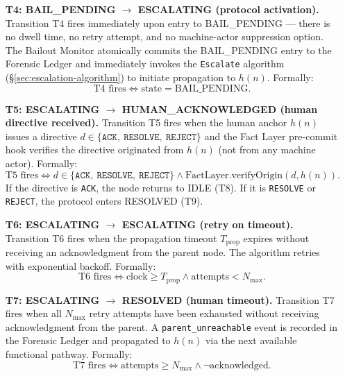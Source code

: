 \begin{enumerate}
\item[\textbf{T4: BAIL\_PENDING $\rightarrow$ ESCALATING (protocol activation).}] Transition T4 fires immediately upon entry to BAIL\_PENDING — there is no dwell time, no retry attempt, and no machine-actor suppression option. The Bailout Monitor atomically commits the BAIL\_PENDING entry to the Forensic Ledger and immediately invokes the \texttt{Escalate} algorithm (\S\ref{sec:escalation-algorithm}) to initiate propagation to $h(n)$. Formally:
\begin{equation}
\text{T4 fires} \iff \text{state} = \text{BAIL\_PENDING}. \tag{T4}
\end{equation}

\item[\textbf{T5: ESCALATING $\rightarrow$ HUMAN\_ACKNOWLEDGED (human directive received).}] Transition T5 fires when the human anchor $h(n)$ issues a directive $d \in \{\texttt{ACK},\ \texttt{RESOLVE},\ \texttt{REJECT}\}$ and the Fact Layer pre-commit hook verifies the directive originated from $h(n)$ (not from any machine actor). Formally:
\begin{equation}
\text{T5 fires} \iff d \in \{\texttt{ACK},\ \texttt{RESOLVE},\ \texttt{REJECT}\} \land \text{FactLayer.verifyOrigin}(d, h(n)). \tag{T5}
\end{equation}
If the directive is \texttt{ACK}, the node returns to IDLE (T8). If it is \texttt{RESOLVE} or \texttt{REJECT}, the protocol enters RESOLVED (T9).

\item[\textbf{T6: ESCALATING $\rightarrow$ ESCALATING (retry on timeout).}] Transition T6 fires when the propagation timeout $T_{\text{prop}}$ expires without receiving an acknowledgment from the parent node. The algorithm retries with exponential backoff. Formally:
\begin{equation}
\text{T6 fires} \iff \text{clock} \geq T_{\text{prop}} \land \text{attempts} < N_{\max}. \tag{T6}
\end{equation}

\item[\textbf{T7: ESCALATING $\rightarrow$ RESOLVED (human timeout).}] Transition T7 fires when all $N_{\max}$ retry attempts have been exhausted without receiving acknowledgment from the parent. A \texttt{parent\_unreachable} event is recorded in the Forensic Ledger and propagated to $h(n)$ via the next available functional pathway. Formally:
\begin{equation}
\text{T7 fires} \iff \text{attempts} \geq N_{\max} \land \neg\text{acknowledged}. \tag{T7}
\end{equation}
\end{enumerate}

